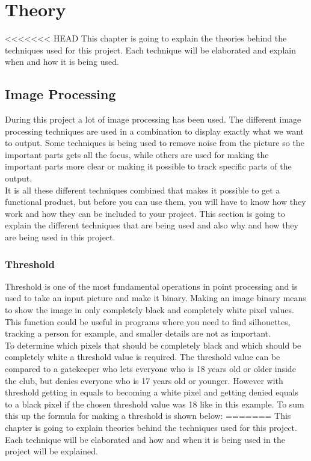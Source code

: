 \chapter{Theory}
<<<<<<< HEAD
This chapter is going to explain the theories behind the techniques used for this project. Each technique will be elaborated and explain when and how it is being used.
\section{Image Processing}
During this project a lot of image processing has been used. The different image processing techniques are used in a combination to display exactly what we want to output. Some techniques is being used to remove noise from the picture so the important parts gets all the focus, while others are used for making the important parts more clear or making it possible to track specific parts of the output. \\
It is all these different techniques combined that makes it possible to get a functional product, but before you can use them, you will have to know how they work and how they can be included to your project. This section is going to explain the different techniques that are being used and also why and how they are being used in this project.
\subsection{Threshold}
Threshold is one of the most fundamental operations in point processing and is used to take an input picture and make it binary. Making an image binary means to show the image in only completely black and completely white pixel values. \\
This function could be useful in programs where you need to find silhouettes, tracking a person for example, and smaller details are not as important. \\
To determine which pixels that should be completely black and which should be completely white a threshold value is required. The threshold value can be compared to a gatekeeper who lets everyone who is 18 years old or older inside the club, but denies everyone who is 17 years old or younger. However with threshold getting in equals to becoming a white pixel and getting denied equals to a black pixel if the chosen threshold value was 18 like in this example. To sum this up the formula for making a threshold is shown below:
=======
This chapter is going to explain theories behind the techniques used for this project. Each technique will be elaborated and how and when it is being used in the project will be explained.

